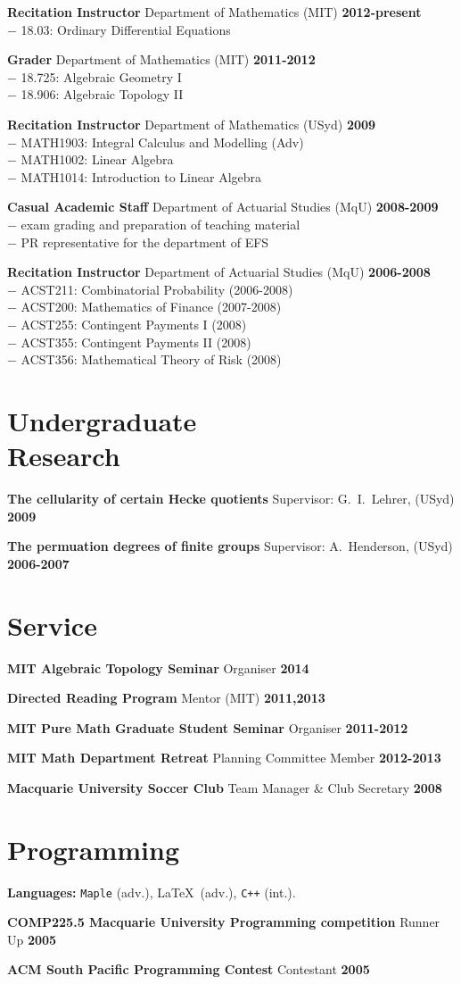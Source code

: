 \documentclass[margin,line]{resume}
\newcommand{\CVsection}[1]{\section{\mysidestyle #1}}
\newcommand{\entry}[3]{\textbf{#1} #2 \hfill \textbf{#3}
           
\vspace{-2.6mm}}
\newcommand{\twolineentry}[4]{\textbf{#1} #2 \hfill \textbf{#4}\\%
#3
           
\vspace{-2.6mm}}
\newcommand{\FINALentry}[3]{\textbf{#1} #2 \hfill \textbf{#3}}
\newcommand{\FINALtwolineentry}[4]{\textbf{#1} #2 \hfill \textbf{#4}\\%
#3}
\begin{document}
\begin{resume}
\twolineentry{Recitation Instructor}{Department of Mathematics (MIT)}{\phantom{space}$-$ 18.03: Ordinary Differential Equations}{2012-present}
\twolineentry{Grader}{Department of Mathematics (MIT)}{%
\phantom{space}$-$ 18.725: Algebraic Geometry I\\
\phantom{space}$-$ 18.906: Algebraic Topology II%
}{2011-2012}
\twolineentry{Recitation Instructor}{Department of Mathematics (USyd)}{%
\phantom{space}$-$ MATH1903: Integral Calculus and Modelling (Adv)\\
\phantom{space}$-$ MATH1002: Linear Algebra\\
\phantom{space}$-$ MATH1014: Introduction to Linear Algebra%
}{2009}
\twolineentry{Casual Academic Staff}{Department of Actuarial Studies (MqU)}{%
\phantom{space}$-$ exam grading and preparation of teaching material\\
\phantom{space}$-$ PR representative for the department of EFS%
}{2008-2009}
\FINALtwolineentry{Recitation Instructor}{Department of Actuarial Studies (MqU)}{%
\phantom{space}$-$ ACST211: Combinatorial Probability (2006-2008)\\
\phantom{space}$-$ ACST200: Mathematics of Finance (2007-2008)\\
\phantom{space}$-$ ACST255: Contingent Payments I (2008)\\
\phantom{space}$-$ ACST355: Contingent Payments II (2008)\\
\phantom{space}$-$ ACST356: Mathematical Theory of Risk (2008)%
}{2006-2008}


\CVsection{Undergraduate \\ Research}

\entry{The cellularity of certain Hecke quotients}{Supervisor: G.\ I.\ Lehrer, (USyd)}{2009}
\FINALentry{The permuation degrees of finite groups}{Supervisor: A.\ Henderson, (USyd)}{2006-2007}


\CVsection{Service}

\entry{MIT Algebraic Topology Seminar}{Organiser}{2014}
\entry{Directed Reading Program}{Mentor (MIT)}{2011,2013}
\entry{MIT Pure Math Graduate Student Seminar}{Organiser}{2011-2012}
\entry{MIT Math Department Retreat}{Planning Committee Member}{2012-2013}
\FINALentry{Macquarie University Soccer Club}{Team Manager \& Club Secretary}{2008}


\CVsection{Programming}

\entry{Languages:}{\texttt{Maple} (adv.), \LaTeX\ (adv.), \texttt{C++} (int.).}{}
\entry{COMP225.5 Macquarie University Programming competition}{Runner Up}{2005}
\FINALentry{ACM South Pacific Programming Contest}{Contestant}{2005}



\end{resume}
\end{document}
